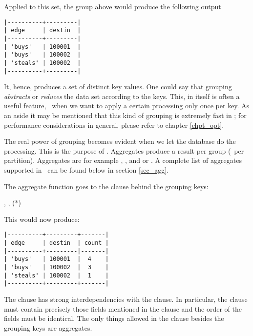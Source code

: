 Applied to this set,
the group above would produce the following output

\begin{minipage}{\textwidth}
\begin{verbatim}
|----------+---------|
| edge     | destin  |
|----------+---------|
| 'buys'   | 100001  |
| 'buys'   | 100002  |
| 'steals' | 100002  |
|----------+---------|
\end{verbatim}
\end{minipage}

It, hence, produces a set of distinct key values.
One could say that grouping \emph{abstracts} or \emph{reduces}
the data set according to the keys.
This, in itself is often a useful feature,
\viz\ when we want to apply a certain processing
only once per key. As an aside it may be mentioned
that this kind of grouping is extremely fast in \nowdb;
for performance considerations in general, please
refer to chapter \ref{chpt_opt}.

The real power of grouping becomes evident
when we let the database do the processing.
This is the purpose of .
Aggregates produce a result per group (\ie\ per partition).
Aggregates are for example
, ,
 and  or .
A complete list of aggregates supported in \nowdb\
can be found below in section \ref{sec_agg}.

The aggregate function goes to the  clause
behind the grouping keys:

 ,
                 ,
                 (*)
 
 

This would now produce:

\begin{minipage}{\textwidth}
\begin{verbatim}
|----------+---------+-------|
| edge     | destin  | count |
|----------+---------|-------|
| 'buys'   | 100001  |  4    |
| 'buys'   | 100002  |  3    |
| 'steals' | 100002  |  1    |
|----------+---------+-------|
\end{verbatim}
\end{minipage}

The  clause has strong interdependencies
with the  clause.
In particular, the  clause must
contain precisely those fields mentioned in the
 clause and the order of the fields
must be identical. The only things allowed in
the  clause besides the grouping keys
are aggregates.

